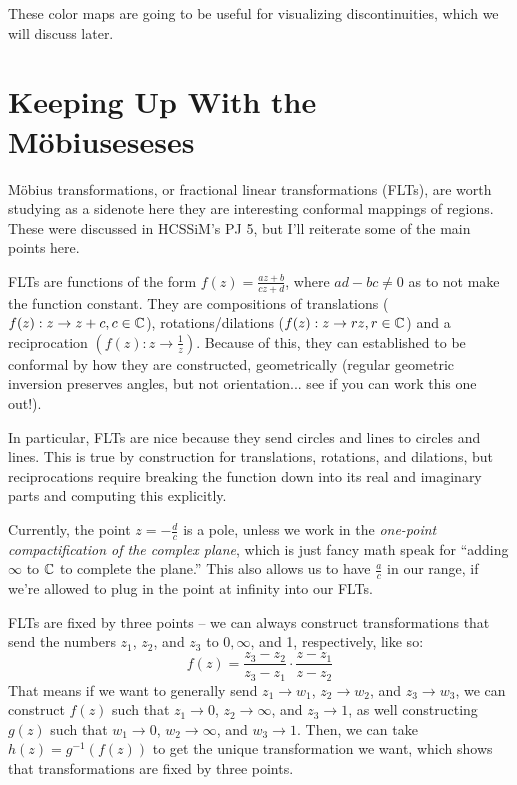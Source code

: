 These color maps are going to be useful for visualizing discontinuities, which we will discuss later.

\section{Keeping Up With the M\"{o}biuseseses}
M\"{o}bius transformations, or fractional linear transformations (FLTs), are worth studying as a sidenote here they are interesting conformal mappings of regions. These were discussed in HCSSiM's PJ 5, but I'll reiterate some of the main points here.

FLTs are functions of the form $f(z) = \frac{az+b}{cz+d}$, where $ad - bc \neq 0$ as to not make the function constant. They are compositions of translations ($f(z) : z \rightarrow z + c, c \in \mathbb C$), rotations/dilations ($f(z) : z \rightarrow rz, r \in \mathbb C$) and a reciprocation $\left(f(z) : z \rightarrow \frac{1}{z}\right)$. Because of this, they can established to be conformal by how they are constructed, geometrically (regular geometric inversion preserves angles, but not orientation... see if you can work this one out!).

In particular, FLTs are nice because they send circles and lines to circles and lines. This is true by construction for translations, rotations, and dilations, but reciprocations require breaking the function down into its real and imaginary parts and computing this explicitly.

Currently, the point $z = - \frac{d}{c}$ is a pole, unless we work in the \textit{one-point compactification of the complex plane}, which is just fancy math speak for ``adding $\infty$ to $\mathbb C$ to complete the plane.'' This also allows us to have $\frac{a}{c}$ in our range, if we're allowed to plug in the point at infinity into our FLTs.

FLTs are fixed by three points -- we can always construct transformations that send the numbers $z_1$, $z_2$, and $z_3$ to $0, \infty$, and 1, respectively, like so:
\[
    f(z) = \frac{z_3-z_2}{z_3-z_1} \cdot \frac{z-z_1}{z-z_2}
\]
That means if we want to generally send $z_1 \rightarrow w_1$, $z_2 \rightarrow w_2$, and $z_3 \rightarrow w_3$, we can construct $f(z)$ such that $z_1 \rightarrow 0$, $z_2 \rightarrow \infty$, and $z_3 \rightarrow 1$, as well constructing $g(z)$ such that $w_1 \rightarrow 0$, $w_2 \rightarrow \infty$, and $w_3 \rightarrow 1$. Then, we can take $h(z) = g^{-1}(f(z))$ to get the unique transformation we want, which shows that transformations are fixed by three points.

